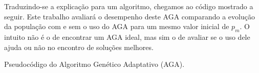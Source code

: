 Traduzindo-se a explicação para um algoritmo, chegamos ao código mostrado a seguir. Este trabalho avaliará o desempenho deste AGA comparando a evolução da população com e sem o uso do AGA para um mesmo valor inicial de $p_m$. O intuito não é o de encontrar um AGA ideal, mas sim o de avaliar se o uso dele ajuda ou não no encontro de soluções melhores.

\begin{algorithm}[ht]
\caption{Pseudocódigo do Algoritmo Genético Adaptativo (AGA).}
\label{alg:aga}
\end{algorithm}
